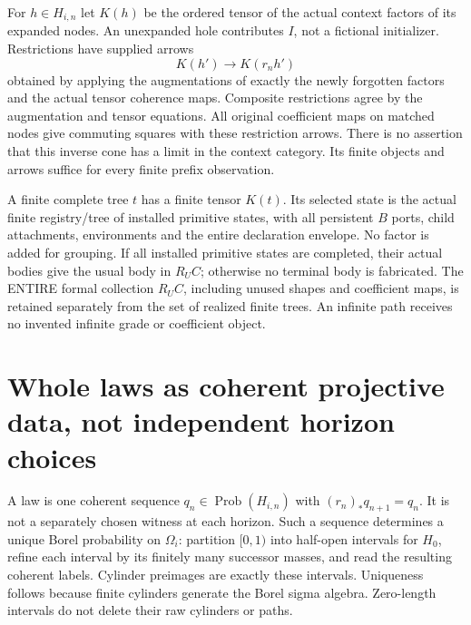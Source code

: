 \documentclass[11pt]{article}
\begin{document}
For $h\in H_{i,n}$ let $K(h)$ be the ordered tensor of the actual context factors of its expanded nodes. An unexpanded hole contributes $I$, not a fictional initializer. Restrictions have supplied arrows
\[
 K(h')\longrightarrow K(r_nh')
\]
obtained by applying the augmentations of exactly the newly forgotten factors and the actual tensor coherence maps. Composite restrictions agree by the augmentation and tensor equations. All original coefficient maps on matched nodes give commuting squares with these restriction arrows. There is no assertion that this inverse cone has a limit in the context category. Its finite objects and arrows suffice for every finite prefix observation.

A finite complete tree $t$ has a finite tensor $K(t)$. Its selected state is the actual finite registry/tree of installed primitive states, with all persistent $B$ ports, child attachments, environments and the entire declaration envelope. No factor is added for grouping. If all installed primitive states are completed, their actual bodies give the usual body in $R_U C$; otherwise no terminal body is fabricated. The ENTIRE formal collection $R_U C$, including unused shapes and coefficient maps, is retained separately from the set of realized finite trees. An infinite path receives no invented infinite grade or coefficient object.

\section{Whole laws as coherent projective data, not independent horizon choices}
A law is one coherent sequence $q_n\in\operatorname{Prob}(H_{i,n})$ with $(r_n)_*q_{n+1}=q_n$. It is not a separately chosen witness at each horizon. Such a sequence determines a unique Borel probability on $\Omega_i$: partition $[0,1)$ into half-open intervals for $H_0$, refine each interval by its finitely many successor masses, and read the resulting coherent labels. Cylinder preimages are exactly these intervals. Uniqueness follows because finite cylinders generate the Borel sigma algebra. Zero-length intervals do not delete their raw cylinders or paths.
\end{document}
